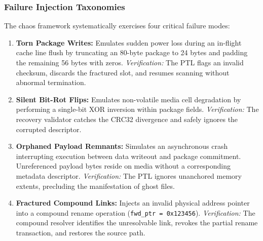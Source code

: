 \documentclass[conference]{IEEEtran}
\begin{document}
\subsubsection{Failure Injection Taxonomies}
The chaos framework systematically exercises four critical failure modes:
\begin{enumerate}
    \item \textbf{Torn Package Writes:} Emulates sudden power loss during an in-flight cache line flush by truncating an 80-byte package to 24 bytes and padding the remaining 56 bytes with zeros.
    \textit{Verification:} The PTL flags an invalid checksum, discards the fractured slot, and resumes scanning without abnormal termination.
    \item \textbf{Silent Bit-Rot Flips:} Emulates non-volatile media cell degradation by performing a single-bit XOR inversion within package fields.
    \textit{Verification:} The recovery validator catches the CRC32 divergence and safely ignores the corrupted descriptor.
    \item \textbf{Orphaned Payload Remnants:} Simulates an asynchronous crash interrupting execution between data writeout and package commitment. Unreferenced payload bytes reside on media without a corresponding metadata descriptor.
    \textit{Verification:} The PTL ignores unanchored memory extents, precluding the manifestation of ghost files.
    \item \textbf{Fractured Compound Links:} Injects an invalid physical address pointer into a compound rename operation (\texttt{fwd\_ptr = 0x123456}).
    \textit{Verification:} The compound resolver identifies the unresolvable link, revokes the partial rename transaction, and restores the source path.
\end{enumerate}
\end{document}
